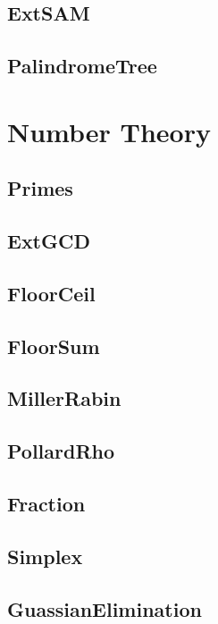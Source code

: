 	\subsection{ExtSAM}
	
	\subsection{PalindromeTree}
	
\section{Number Theory}
	\subsection{Primes}
	
	\subsection{ExtGCD}
	
	\subsection{FloorCeil}
	
	\subsection{FloorSum}
	
	\subsection{MillerRabin}
	
	\subsection{PollardRho}
	
	\subsection{Fraction}
	
	\subsection{Simplex}
	
	
	\subsection{GuassianElimination}
	
